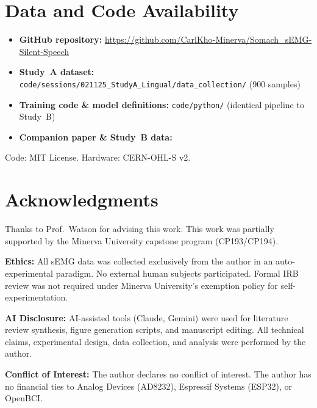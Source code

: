 \documentclass{article}
\begin{document}
\section*{Data and Code Availability}

\begin{itemize}
    \item \textbf{GitHub repository:} \url{https://github.com/CarlKho-Minerva/Somach_sEMG-Silent-Speech}
    \item \textbf{Study~A dataset:} \texttt{code/sessions/021125\_StudyA\_Lingual/data\_collection/} (900 samples)
    \item \textbf{Training code \& model definitions:} \texttt{code/python/} (identical pipeline to Study~B)
    \item \textbf{Companion paper \& Study~B data:}~\cite{kho2026companion}
\end{itemize}
Code: MIT License. Hardware: CERN-OHL-S v2.

\section*{Acknowledgments}

Thanks to Prof.\ Watson for advising this work. This work was partially supported by the Minerva University capstone program (CP193/CP194).

\textbf{Ethics:} All sEMG data was collected exclusively from the author in an auto-experimental paradigm. No external human subjects participated. Formal IRB review was not required under Minerva University's exemption policy for self-experimentation.

\textbf{AI Disclosure:} AI-assisted tools (Claude, Gemini) were used for literature review synthesis, figure generation scripts, and manuscript editing. All technical claims, experimental design, data collection, and analysis were performed by the author.

\textbf{Conflict of Interest:} The author declares no conflict of interest. The author has no financial ties to Analog Devices (AD8232), Espressif Systems (ESP32), or OpenBCI.
\end{document}
